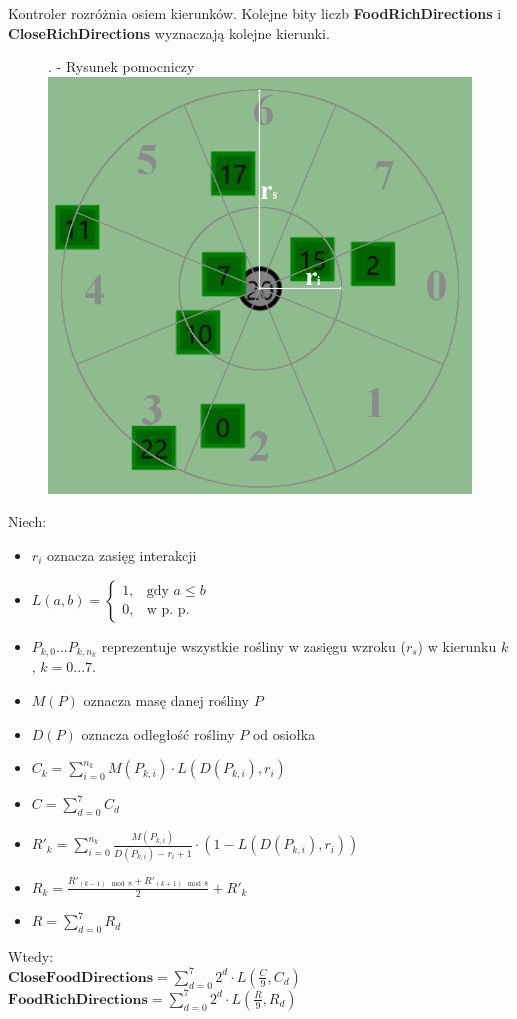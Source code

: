 Kontroler rozróżnia osiem kierunków. Kolejne bity liczb \textbf{FoodRichDirections} i \textbf{CloseRichDirections} wyznaczają kolejne kierunki.

\begin{figure}[H]
    . - Rysunek pomocniczy\\
    \includegraphics[scale=0.4]{Chapters/vision}
\end{figure}

Niech:
\begin{itemize}
    \item $r_{i}$ oznacza zasięg interakcji
    \item
     $L(a,b)= 
    \begin{cases}
        1,& \text{gdy } a\leq b\\
        0,              & \text{w p. p.}
    \end{cases}
    $
    \item $P_{k,0}...P_{k,n_{k}}$ reprezentuje wszystkie rośliny w zasięgu wzroku ($r_{s}$) w kierunku $k$, $k=0...7$. 
    \item $M(P)$ oznacza masę danej rośliny $P$
    \item $D(P)$ oznacza odległość rośliny $P$ od osiołka
    \item $C_{k} = \sum_{i=0}^{n_{k}} M(P_{k,i}) \cdot L(D(P_{k,i}),r_{i})  $
    \item $C = \sum_{d=0}^{7} C_{d}$
    \item $R'_{k} = \sum_{i=0}^{n_{k}} \frac{M(P_{k,i})}{D(P_{k,i}) - r_{i} + 1} \cdot (1-L(D(P_{k,i}),r_{i})) $
    \item $R_{k} = \frac{R'_{(k-1) \mod 8} + R'_{(k+1) \mod 8}}{2} + R'_{k}$
    \item $R = \sum_{d=0}^{7} R_{d}$
\end{itemize}
\clearpage
Wtedy:
\\$\textbf{CloseFoodDirections} = \sum_{d=0}^{7} 2^{d} \cdot L(\frac{C}{9},C_{d})$
\\$\textbf{FoodRichDirections} = \sum_{d=0}^{7} 2^{d} \cdot L(\frac{R}{9},R_{d})$

